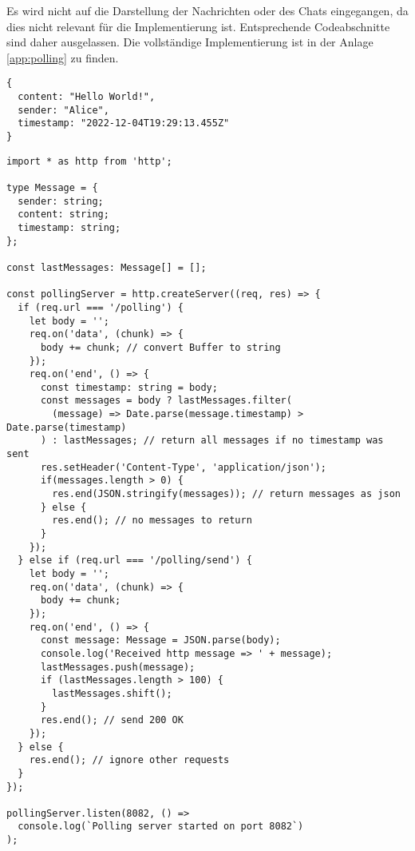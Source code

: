 \documentclass[sigplan, screen]{acmart}
\begin{document}
Es wird nicht auf die Darstellung der Nachrichten oder des Chats eingegangen, da dies nicht relevant für die Implementierung ist.
Entsprechende Codeabschnitte sind daher ausgelassen.
Die vollständige Implementierung ist in der Anlage \ref{app:polling} zu finden.


\begin{lstlisting}[caption={Beispielhafte Nachricht}, label={lst:polling-json}]
{
  content: "Hello World!",
  sender: "Alice",
  timestamp: "2022-12-04T19:29:13.455Z"
}
\end{lstlisting}


\begin{lstlisting}[caption={Polling Server}, label={lst:polling-server}]
import * as http from 'http';

type Message = {
  sender: string;
  content: string;
  timestamp: string;
};

const lastMessages: Message[] = [];

const pollingServer = http.createServer((req, res) => {
  if (req.url === '/polling') {
    let body = '';
    req.on('data', (chunk) => {
      body += chunk; // convert Buffer to string
    });
    req.on('end', () => {
      const timestamp: string = body;
      const messages = body ? lastMessages.filter(
        (message) => Date.parse(message.timestamp) > Date.parse(timestamp)
      ) : lastMessages; // return all messages if no timestamp was sent
      res.setHeader('Content-Type', 'application/json');
      if(messages.length > 0) {
        res.end(JSON.stringify(messages)); // return messages as json
      } else {
        res.end(); // no messages to return
      }
    });
  } else if (req.url === '/polling/send') {
    let body = '';
    req.on('data', (chunk) => {
      body += chunk;
    });
    req.on('end', () => {
      const message: Message = JSON.parse(body);
      console.log('Received http message => ' + message);
      lastMessages.push(message);
      if (lastMessages.length > 100) {
        lastMessages.shift();
      }
      res.end(); // send 200 OK
    });
  } else {
    res.end(); // ignore other requests
  }
});

pollingServer.listen(8082, () =>
  console.log(`Polling server started on port 8082`)
);
\end{lstlisting}
\end{document}

